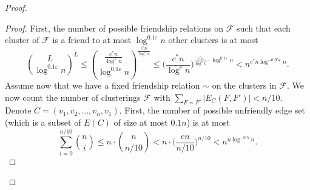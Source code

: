\documentclass[11pt]{article}
\theoremstyle{definition}
\newcommand{\fset}{{\mathcal{F}}}
\newcommand{\eps}{{\varepsilon}}
\newcounter{note}
\begin{document}
\begin{titlepage}
\begin{proof}
\begin{proof}
First, the number of possible friendship relations on $\fset$ such that each cluster of $\fset$ is a friend to at most $\log^{0.1\eps} n$ other clusters is at most 
$$
\binom{L}{\log^{0.1\eps} n}^L\le 
\binom{\frac{c^*n}{\log^{\eps} n}}{\log^{0.1\eps} n} ^{\frac{c^*n}{\log^{\eps} n}} \le \bigg(\frac{c^*n}{\log^{\eps} n}\bigg)^{\frac{c^*n}{\log^{\eps} n}\cdot \log^{0.1\eps} n}<  n^{c^*n \log^{-0.05\eps} n}.
$$
Assume now that we have a fixed friendship relation $\sim$ on the clusters in $\fset$. We now count the number of clusterings $\fset$ with $\sum_{F\not\sim F'}|E_{C}(F,F')| < n/10$.
Denote $C=(v_1, v_2, \ldots, v_n,v_1)$. 
First, the number of possible unfriendly edge set (which is a subset of $E(C)$ of size at most $0.1n$) is at most
$$\sum_{i=0}^{n/10} \binom{n}{i} \le n \cdot \binom{n}{n/10} < n\cdot \bigg(\frac{en}{n/10}\bigg)^{n/10} < n^{n \log^{-0.5}n}.$$


\end{proof}
\end{proof}
\end{titlepage}
\end{document}
